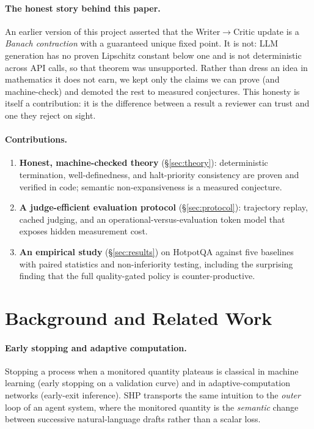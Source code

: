 \documentclass[conference]{IEEEtran}
\begin{document}
\paragraph{The honest story behind this paper.} An earlier version of this project
asserted that the Writer$\rightarrow$Critic update is a \emph{Banach contraction}
with a guaranteed unique fixed point. It is not: LLM generation has no proven
Lipschitz constant below one and is not deterministic across API calls, so that
theorem was unsupported. Rather than dress an idea in mathematics it does not
earn, we kept only the claims we can prove (and machine-check) and demoted the
rest to measured conjectures. This honesty is itself a contribution: it is the
difference between a result a reviewer can trust and one they reject on sight.

\paragraph{Contributions.}
\begin{enumerate}[leftmargin=1.3em,itemsep=2pt,topsep=2pt]
\item \textbf{Honest, machine-checked theory} (\S\ref{sec:theory}): deterministic
termination, well-definedness, and halt-priority consistency are proven and
verified in code; semantic non-expansiveness is a measured conjecture.
\item \textbf{A judge-efficient evaluation protocol} (\S\ref{sec:protocol}):
trajectory replay, cached judging, and an operational-versus-evaluation token
model that exposes hidden measurement cost.
\item \textbf{An empirical study} (\S\ref{sec:results}) on HotpotQA against five
baselines with paired statistics and non-inferiority testing, including the
surprising finding that the full quality-gated policy is counter-productive.
\end{enumerate}

\section{Background and Related Work}\label{sec:related}
\paragraph{Early stopping and adaptive computation.} Stopping a process when a
monitored quantity plateaus is classical in machine learning (early stopping on a
validation curve) and in adaptive-computation networks (early-exit inference).
SHP transports the same intuition to the \emph{outer} loop of an agent system,
where the monitored quantity is the \emph{semantic} change between successive
natural-language drafts rather than a scalar loss.
\end{document}

